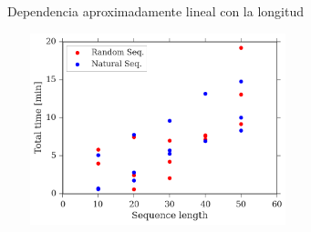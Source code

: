\documentclass{beamer}
\begin{document}
\begin{frame}[plain]{Dependencia aproximadamente lineal con la longitud}

\centering
\begin{adjustwidth}{-1.5em}{-2.5em}
\includegraphics[width=330px,height=210px]{../img/lengthVsTime.png} 
\end{adjustwidth}
\end{frame}



















% 
% 
\end{document}

